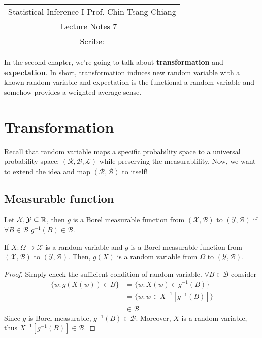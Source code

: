 \documentclass[../Transformation.tex]{subfiles}
\begin{document}
	\begin{center}
		\renewcommand{\arraystretch}{2}
		\begin{bfseries}
			\begin{tabular}{|c|}
				\hline
				Statistical Inference I \hfill Prof. Chin-Tsang Chiang\\
				\hspace{15em} {\large Lecture Notes 7} \hspace{15em}\ \\
				\lecdate \hfill Scribe: \scribe\\
				\hline
			\end{tabular}
			\renewcommand{\arraystretch}{1}
		\end{bfseries}
	\end{center}
	
In the second chapter, we're going to talk about {\bf transformation} and {\bf expectation}. In short, transformation induces new random variable with a known random variable and expectation is the functional a random variable and somehow provides a weighted average sense.

\section{Transformation}
Recall that random variable maps a specific probability space to a universal probability space: $(\mathcal{R},\mathcal{B},\mathcal{L})$ while preserving the measurablility. Now, we want to extend the idea and map $(\mathcal{R},\mathcal{B})$ to itself!

\subsection{Measurable function}
\begin{definition}
	Let $\mathcal{X},\mathcal{Y}\subseteq{\mathbb R}$, then $g$ is a Borel measurable function from $(\mathcal{X},\mathcal{B})$ to $(\mathcal{Y},\mathcal{B})$ if $\forall B\in\mathcal{B}$ $g^{-1}(B)\in\mathcal{B}$.
\end{definition}

\begin{property}
	If $X:\Omega\rightarrow\mathcal{X}$ is a random variable and $g$ is a Borel measurable function from $(\mathcal{X},\mathcal{B})$ to $(\mathcal{Y},\mathcal{B})$. Then, $g(X)$ is a random variable from $\Omega$ to $(\mathcal{Y},\mathcal{B})$.
\end{property}
\begin{proof}
	Simply check the sufficient condition of random variable. $\forall B\in\mathcal{B}$ consider 
	\begin{align*}
	\{w:g(X(w))\in B \}&=\{w:X(w)\in g^{-1}(B) \}\\
	&= \{w:w\in X^{-1}[g^{-1}(B)] \}\\
	&\in\mathcal{B}
	\end{align*}
	Since $g$ is Borel measurable, $g^{-1}(B)\in\mathcal{B}$. Moreover, $X$ is a random variable, thus $X^{-1}[g^{-1}(B)]\in\mathcal{B}$.
\end{proof}
\end{document}
